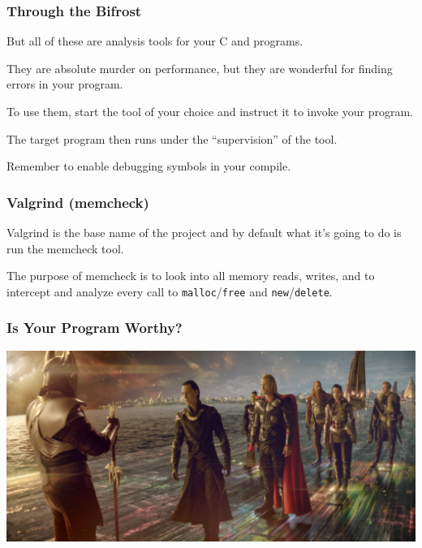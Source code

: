 \begin{frame}
	\frametitle{Through the Bifrost}

	But all of these are analysis tools for your C and \Cpp programs.

	They are absolute murder on performance, but they are wonderful for finding errors in your program.

	To use them, start the tool of your choice and instruct it to invoke your program.

	The target program then runs under the ``supervision'' of the tool.

	Remember to enable debugging symbols in your compile.

\end{frame}

\begin{frame}
	\frametitle{Valgrind (memcheck)}

	Valgrind is the base name of the project and by default what it's going to do is run the memcheck tool.

	The purpose of memcheck is to look into all memory reads, writes, and to intercept and analyze every call to \texttt{malloc}/\texttt{free} and \texttt{new}/\texttt{delete}.

\end{frame}

\begin{frame}
	\frametitle{Is Your Program Worthy?}

	\begin{center}
		\includegraphics[width=\textwidth]{images/heimdall-waits.jpg}
	\end{center}

\end{frame}


